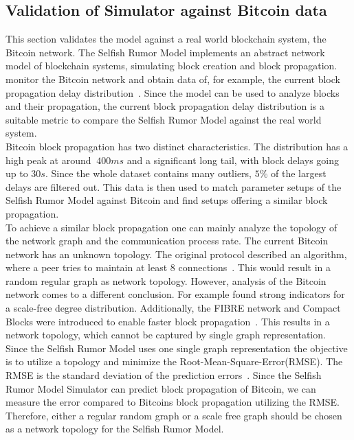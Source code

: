 \subsection{Validation of Simulator against Bitcoin data}
This section validates the model against a real world blockchain system, the Bitcoin network. The Selfish Rumor Model implements an abstract network model of blockchain systems, simulating block creation and block propagation.
 monitor the Bitcoin network and obtain data of, for example, the current block propagation delay distribution~\cite{BitcoinNetworkMonitor}. Since the model can be used to analyze blocks and their propagation, the current block propagation delay distribution is a suitable metric to compare the Selfish Rumor Model against the real world system.\\
Bitcoin block propagation has two distinct characteristics. The distribution has a high peak at around $~400ms$ and a significant long tail, with block delays going up to $30s$. Since the whole dataset contains many outliers, $5\% $ of the largest delays are filtered out. This data is then used to match parameter setups of the Selfish Rumor Model against Bitcoin and find setups offering a similar block propagation.\\
To achieve a similar block propagation one can mainly analyze the topology of the network graph and the communication process rate.
The current Bitcoin network has an unknown topology. The original protocol described an algorithm, where a peer tries to maintain at least 8 connections~\cite{tschorsch}. This would result in a random regular graph as network topology. However, analysis of the Bitcoin network comes to a different conclusion.
For example  found strong indicators for a scale-free degree distribution.
Additionally, the FIBRE network and Compact Blocks were introduced to enable faster block propagation~\cite{measurement}. This results in a network topology, which cannot be captured by single graph representation.\\
Since the Selfish Rumor Model uses one single graph representation the objective is to utilize a topology and minimize the Root-Mean-Square-Error(RMSE). The RMSE is the standard deviation of the prediction errors~\cite{RMSE}. Since the Selfish Rumor Model Simulator can predict block propagation of Bitcoin, we can measure the error compared to Bitcoins block propagation utilizing the RMSE. Therefore, either a regular random graph or a scale free graph should be chosen as a network topology for the Selfish Rumor Model. 

